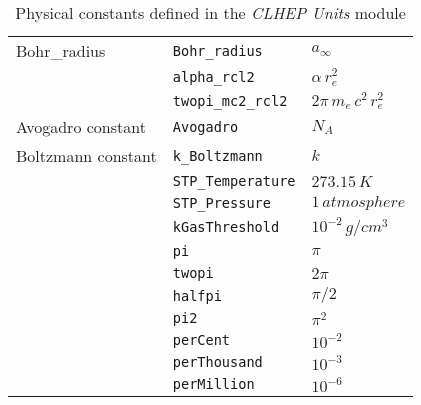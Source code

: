 \begin{table}
\begin{tabular}{|l|l|l|}
Bohr\_{}radius            &{\tt Bohr\_{}radius}  &$ a_\infty               $\\
                          &{\tt alpha\_{}rcl2}   &$ \alpha\,r_e^2          $\\
                          &{\tt twopi\_{}mc2\_{}rcl2}&$ 2\pi\,m_e\,c^2\,r_e^2$\\
Avogadro constant         &{\tt Avogadro}        &$ N_A                    $\\
Boltzmann constant        &{\tt k\_Boltzmann}    &$ k                      $\\
                          &{\tt STP\_{}Temperature}&$ 273.15\,K            $\\
                          &{\tt STP\_{}Pressure} &$ 1\,atmosphere          $\\
                          &{\tt kGasThreshold}   &$ 10^{-2}\,g/cm^3        $\\
\hline
                          &{\tt pi}              &$ \pi                    $\\
                          &{\tt twopi}           &$ 2\pi                   $\\
                          &{\tt halfpi}          &$ \pi/2                  $\\
                          &{\tt pi2}             &$ \pi^2                  $\\
                          &{\tt perCent}         &$ 10^{-2}                $\\
                          &{\tt perThousand}     &$ 10^{-3}                $\\
                          &{\tt perMillion}      &$ 10^{-6}                $\\
\hline 
\end {tabular}
\caption{Physical constants defined in the {\it CLHEP Units} module}
\label{tab2}
\end{table}


